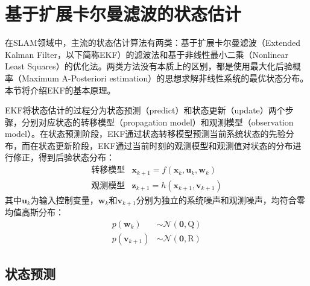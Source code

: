 \section{基于扩展卡尔曼滤波的状态估计}

在SLAM领域中，主流的状态估计算法有两类：基于扩展卡尔曼滤波（Extended Kalman Filter，以下简称EKF）的滤波法和基于非线性最小二乘（Nonlinear Least Squares）的优化法。两类方法没有本质上的区别，都是使用最大化后验概率（Maximum A-Posteriori estimation）的思想求解非线性系统的最优状态分布。本节将介绍EKF的基本原理。

EKF将状态估计的过程分为状态预测（predict）和状态更新（update）两个步骤，分别对应状态的转移模型（propagation model）和观测模型（observation model）。在状态预测阶段，EKF通过状态转移模型预测当前系统状态的先验分布，而在状态更新阶段，EKF通过当前时刻的观测模型和观测值对状态的分布进行修正，得到后验状态分布：
\begin{equation}
\begin{array}{rl}
    \text{转移模型} & \bm{x}_{k+1} = f(\bm{x}_k,\bm{u}_k,\bm{w}_k) \\
    \text{观测模型} & \bm{z}_{k+1} = h(\bm{x}_{k+1},\bm{v}_{k+1})
\end{array}
\end{equation}
其中$\bm{u}_k$为输入控制变量，$\bm{w}_k$和$\bm{v}_{k+1}$分别为独立的系统噪声和观测噪声，均符合零均值高斯分布：
\begin{equation}
\begin{aligned}
    p(\bm{w}_k)     &\sim \mathcal{N}(\bm{0},\mathrm{Q}) \\
    p(\bm{v}_{k+1}) &\sim \mathcal{N}(\bm{0},\mathrm{R})
\end{aligned}
\end{equation}

\subsection{状态预测}

